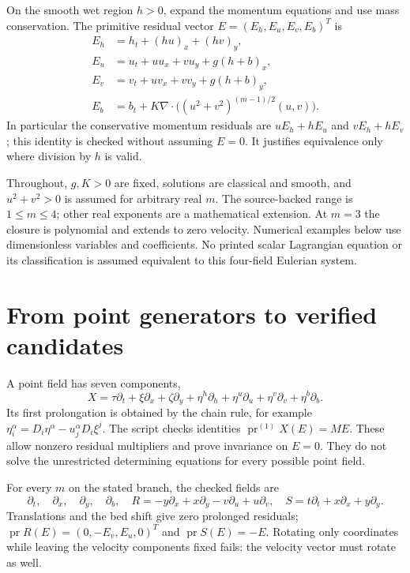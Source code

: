 \documentclass[11pt]{article}
\newcommand{\pr}{\operatorname{pr}}
\begin{document}
On the smooth wet region $h>0$, expand the momentum equations and use mass
conservation. The primitive residual vector $E=(E_h,E_u,E_v,E_b)^T$ is
\begin{equation}\label{eq:primitive}
\begin{aligned}
 E_h&=h_t+(hu)_x+(hv)_y,\\
 E_u&=u_t+uu_x+vu_y+g(h+b)_x,\\
 E_v&=v_t+uv_x+vv_y+g(h+b)_y,\\
 E_b&=b_t+K\nabla\!\cdot\bigl((u^2+v^2)^{(m-1)/2}(u,v)\bigr).
\end{aligned}
\end{equation}
In particular the conservative momentum residuals are $uE_h+hE_u$ and
$vE_h+hE_v$; this identity is checked without assuming $E=0$.
It justifies equivalence only where division by $h$ is valid.

Throughout, $g,K>0$ are fixed, solutions are classical and smooth, and
$u^2+v^2>0$ is assumed for arbitrary real $m$. The source-backed range is
$1\leq m\leq4$; other real exponents are a mathematical extension.
At $m=3$ the closure is polynomial and extends to zero velocity.
Numerical examples below use dimensionless variables and coefficients.
No printed scalar Lagrangian equation or its classification is assumed
equivalent to this four-field Eulerian system.

\section{From point generators to verified candidates}
A point field has seven components,
\[
 X=\tau\partial_t+\xi\partial_x+\zeta\partial_y
    +\eta^h\partial_h+\eta^u\partial_u+\eta^v\partial_v+\eta^b\partial_b.
\]
Its first prolongation is obtained by the chain rule, for example
$\eta_i^\alpha=D_i\eta^\alpha-u_j^\alpha D_i\xi^j$.
The script checks identities $\pr^{(1)}X(E)=M E$. These allow nonzero
residual multipliers and prove invariance on $E=0$. They do not solve the
unrestricted determining equations for every possible point field.

For every $m$ on the stated branch, the checked fields are
\begin{equation}\label{eq:candidates}
\partial_t,\quad\partial_x,\quad\partial_y,\quad\partial_b,\quad
R=-y\partial_x+x\partial_y-v\partial_u+u\partial_v,\quad
S=t\partial_t+x\partial_x+y\partial_y.
\end{equation}
Translations and the bed shift give zero prolonged residuals;
$\pr R(E)=(0,-E_v,E_u,0)^T$ and $\pr S(E)=-E$.
Rotating only coordinates while leaving the velocity components fixed
fails: the velocity vector must rotate as well.
\end{document}
